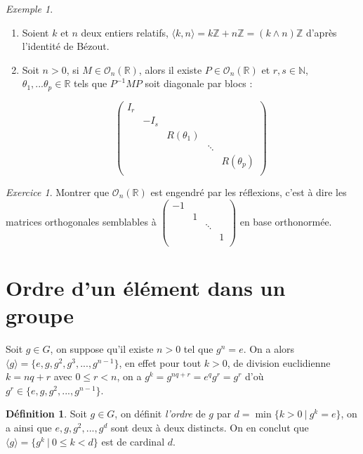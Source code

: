\documentclass[]{article}
\theoremstyle{remark}
\newtheorem{myexer}{Exercice}
\newtheorem{myexmpl}{Exemple}
\theoremstyle{definition}
\newtheorem{mydef}{Définition}
\begin{document}
\begin{myexmpl}
	\begin{enumerate}
	\item Soient $k$ et $n$ deux entiers relatifs, $\langle k, n \rangle = k\mathbb{Z} + n\mathbb{Z} = (k \land n) \mathbb{Z}$ d'après l'identité de Bézout.
	\item Soit $n > 0$, si $M \in \mathcal{O}_n(\mathbb{R})$, alors il existe $P \in \mathcal{O}_n(\mathbb{R})$ et $r, s \in \mathbb{N}$, $\theta_1, ...\theta_p \in \mathbb{R}$ tels que $P^{-1}MP$ soit diagonale par blocs :
	
	$$
		\left(
		\begin{array}{ccccc}
			I_r &  &  &  & \\
			 & -I_s & & &\\
			 & & R(\theta_1) & &\\
			 & & & \ddots & \\
			 & & & & R(\theta_p)\\
		\end{array}
		\right)
	$$
	\end{enumerate}
\end{myexmpl}

\begin{myexer}
	Montrer que $\mathcal{O}_n(\mathbb{R})$ est engendré par les réflexions, c'est à dire les matrices orthogonales semblables à $\left(\begin{array}{cccc}
		-1 &&&\\
		&1&&\\
		&&\ddots&\\
		&&&1\\
	\end{array}\right)$ en base orthonormée.
\end{myexer}

\section{Ordre d'un élément dans un groupe}

Soit $g \in G$, on suppose qu'il existe $n > 0$ tel que $g^n=e$.
On a alors $\langle g \rangle = \{e, g, g^2, g^3, ..., g^{n-1}\}$, en effet pour tout $k > 0$, de division euclidienne $k=nq+r$ avec $0 \leqslant r < n$, on a $g^k=g^{nq+r}=e^q g^r=g^r$ d'où $g^r \in \{e, g, g^2, ..., g^{n-1}\}$.

\begin{mydef}
	Soit $g \in G$, on définit \textit{l'ordre} de $g$ par $d=\min \{k > 0 ~ | ~ g^k = e\}$, on a ainsi que $e, g, g^2, ..., g^d$ sont deux à deux distincts. On en conclut que $\langle g \rangle = \{g^k ~ | ~ 0 \leqslant k < d\}$ est de cardinal $d$.
\end{mydef}
\end{document}
